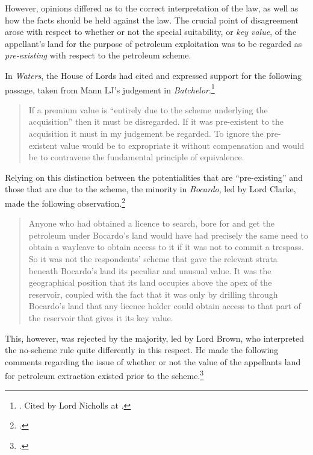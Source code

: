 However, opinions differed as to the correct interpretation of the law, as well as how the facts should be held against the law. The crucial point of disagreement arose with respect to whether or not the special suitability, or \emph{key value}, of the appellant's land for the purpose of petroleum exploitation was to be regarded as \emph{pre-existing} with respect to the petroleum scheme.

In \emph{Waters}, the House of Lords had cited and expressed support for the following passage, taken from Mann LJ's judgement in \emph{Batchelor}.\footnote{\cite[361]{batchelor89}. Cited by Lord Nicholls at \cite[65]{waters04}.}

\begin{quote}
If a premium value is ``entirely due to the scheme underlying the acquisition'' then it must be disregarded. If it was pre-existent to the acquisition it must in my judgement be regarded. To ignore the pre-existent value would be to expropriate it without compensation and would be to contravene the fundamental principle of equivalence.
\end{quote}

Relying on this distinction between the potentialities that are ``pre-existing'' and those that are due to the scheme, the minority in \emph{Bocardo}, led by Lord Clarke, made the following observation.\footcite[42]{bocardo10}

\begin{quote}
Anyone who had obtained a licence to search, bore for and get the petroleum under Bocardo’s
land would have had precisely the same need to obtain a wayleave to obtain access
to it if it was not to commit a trespass. So it was not the respondents' scheme that
gave the relevant strata beneath Bocardo’s land its peculiar and unusual value. It
was the geographical position that its land occupies above the apex of the
reservoir, coupled with the fact that it was only by drilling through Bocardo’s land
that any licence holder could obtain access to that part of the reservoir that gives it
its key value.
\end{quote}

This, however, was rejected by the majority, led by Lord Brown, who interpreted the no-scheme rule quite differently in this respect. He made the following comments regarding the issue of whether or not the value of the appellants land for petroleum extraction existed prior to the scheme.\footcite[83]{bocardo10}

